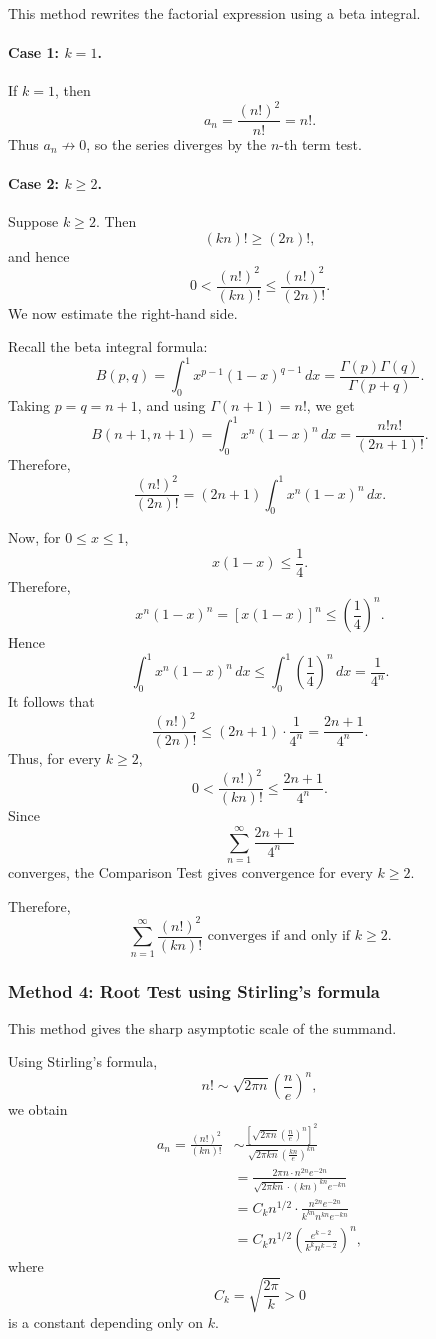 \documentclass[12pt]{article}
\begin{document}
This method rewrites the factorial expression using a beta integral.

\paragraph{Case 1: \(k=1\).}
If \(k=1\), then
\[
a_n=\frac{(n!)^2}{n!}=n!.
\]
Thus \(a_n\not\to 0\), so the series diverges by the \(n\)-th term test.

\paragraph{Case 2: \(k\ge 2\).}
Suppose \(k\ge 2\). Then
\[
(kn)!\ge (2n)!,
\]
and hence
\[
0<
\frac{(n!)^2}{(kn)!}
\le
\frac{(n!)^2}{(2n)!}.
\]
We now estimate the right-hand side.

Recall the beta integral formula:
\[
B(p,q)
=
\int_0^1 x^{p-1}(1-x)^{q-1}\,dx
=
\frac{\Gamma(p)\Gamma(q)}{\Gamma(p+q)}.
\]
Taking \(p=q=n+1\), and using \(\Gamma(n+1)=n!\), we get
\[
B(n+1,n+1)
=
\int_0^1 x^n(1-x)^n\,dx
=
\frac{n!n!}{(2n+1)!}.
\]
Therefore,
\[
\frac{(n!)^2}{(2n)!}
=
(2n+1)
\int_0^1 x^n(1-x)^n\,dx.
\]

Now, for \(0\le x\le 1\),
\[
x(1-x)\le \frac14.
\]
Therefore,
\[
x^n(1-x)^n
=
[x(1-x)]^n
\le
\left(\frac14\right)^n.
\]
Hence
\[
\int_0^1 x^n(1-x)^n\,dx
\le
\int_0^1 \left(\frac14\right)^n\,dx
=
\frac1{4^n}.
\]
It follows that
\[
\frac{(n!)^2}{(2n)!}
\le
(2n+1)\cdot \frac1{4^n}
=
\frac{2n+1}{4^n}.
\]
Thus, for every \(k\ge 2\),
\[
0<
\frac{(n!)^2}{(kn)!}
\le
\frac{2n+1}{4^n}.
\]
Since
\[
\sum_{n=1}^{\infty}\frac{2n+1}{4^n}
\]
converges, the Comparison Test gives convergence for every \(k\ge 2\).

Therefore,
\[
\boxed{\sum_{n=1}^{\infty}\frac{(n!)^2}{(kn)!}
\text{ converges if and only if }k\ge 2.}
\]

\bigskip
\subsubsection*{Method 4: Root Test using Stirling's formula}

This method gives the sharp asymptotic scale of the summand.

Using Stirling's formula,
\[
n!\sim \sqrt{2\pi n}\left(\frac ne\right)^n,
\]
we obtain
\begin{align*}
a_n
=
\frac{(n!)^2}{(kn)!}
&\sim
\frac{
\left[\sqrt{2\pi n}\left(\frac ne\right)^n\right]^2
}{
\sqrt{2\pi kn}\left(\frac{kn}{e}\right)^{kn}
} \\
&=
\frac{
2\pi n\cdot n^{2n}e^{-2n}
}{
\sqrt{2\pi kn}\cdot (kn)^{kn}e^{-kn}
} \\
&=
C_k n^{1/2}
\cdot
\frac{n^{2n}e^{-2n}}{k^{kn}n^{kn}e^{-kn}} \\
&=
C_k n^{1/2}
\left(
\frac{e^{k-2}}{k^k n^{k-2}}
\right)^n,
\end{align*}
where
\[
C_k=\sqrt{\frac{2\pi}{k}}>0
\]
is a constant depending only on \(k\).
\end{document}
